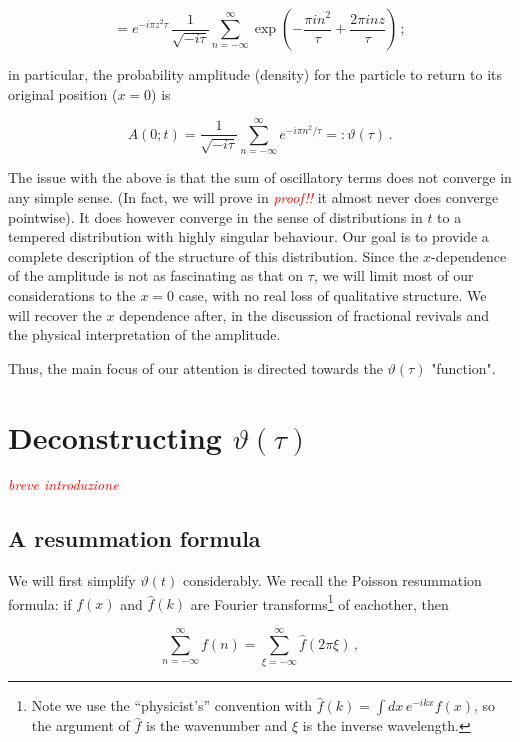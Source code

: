 \documentclass{article}
\newcommand{\T}{\ensuremath{\vartheta}}
\newcommand{\cmnt}[1]{\textcolor{red}{\emph{#1}}}
\newcommand{\sumZ}{\sum_{n=-\infty}^{\infty}}
\begin{document}
\begin{equation} \label{amplitudeztau}
    = e^{-i\pi z^2 \tau}\, \frac{1}{\sqrt{-i\tau}} \sumZ \exp(-\frac{\pi i n^2}{\tau} +  \frac{2\pi i n z}{\tau})   \,;
\end{equation}


in particular, the probability amplitude (density) for the particle to return to its original position ($x=0$) is

\begin{equation}
    A(0;t) = \frac{1}{\sqrt{-i\tau}} \sumZ e^{-{i \pi n^2}/{\tau}} =: \T(\tau)\,.
\end{equation}


The issue with the above is that the sum of oscillatory terms does not converge in any simple sense. (In fact, we will prove in \cmnt{proof!!} it almost never does converge pointwise). It does however converge in the sense of distributions in $t$ to a tempered distribution with highly singular behaviour. Our goal is to provide a complete description of the structure of this distribution. Since the $x$-dependence of the amplitude is not as fascinating as that on $\tau$, we will limit most of our considerations to the $x=0$ case, with no real loss of qualitative structure. We will recover the $x$ dependence after, in the discussion of fractional revivals and the physical interpretation of the amplitude.

Thus, the main focus of our attention is directed towards the $\T(\tau)$ "function".


\section{Deconstructing $\T(\tau)$}

\cmnt{breve introduzione}

\subsection{A resummation formula}\label{resummation}

We will first simplify $\T(t)$ considerably. We recall the Poisson resummation formula: if $f(x)$ and $\hat f(k)$ are Fourier transforms\footnote{Note we use the ``physicist's'' convention with $\hat f(k) = \int dx\, e^{-ikx} f(x)$, so the argument of $\hat f$ is the wavenumber and $\xi$ is the inverse wavelength.} of eachother, then

\begin{equation}
    \sumZ f(n) = \sum_{\xi=-\infty}^{\infty} \hat f(2\pi\xi)\,,
\end{equation}
\end{document}
